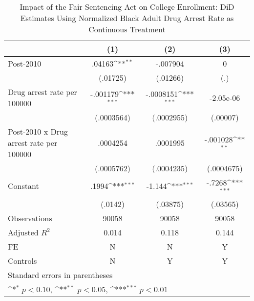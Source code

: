 \begin{table}[htbp]\centering
\def\sym#1{\ifmmode^{#1}\else\(^{#1}\)\fi}
\caption{Impact of the Fair Sentencing Act on College Enrollment: DiD Estimates Using Normalized Black Adult Drug Arrest Rate as Continuous Treatment}
\begin{tabular}{l*{3}{c}}
\hline\hline
                    &\multicolumn{1}{c}{(1)}         &\multicolumn{1}{c}{(2)}         &\multicolumn{1}{c}{(3)}         \\
\hline
Post-2010           &      .04163\sym{**} &    -.007904         &           0         \\
                    &    (.01725)         &    (.01266)         &         (.)         \\
[1em]
Drug arrest rate per 100000&    -.001179\sym{***}&   -.0008151\sym{***}&   -2.05e-06         \\
                    &  (.0003564)         &  (.0002955)         &    (.00007)         \\
[1em]
Post-2010 x Drug arrest rate per 100000&    .0004254         &    .0001995         &    -.001028\sym{**} \\
                    &  (.0005762)         &  (.0004235)         &  (.0004675)         \\
[1em]
Constant            &       .1994\sym{***}&      -1.144\sym{***}&      -.7268\sym{***}\\
                    &     (.0142)         &    (.03875)         &    (.03565)         \\
\hline
Observations        &       90058         &       90058         &       90058         \\
Adjusted \(R^{2}\)  &       0.014         &       0.118         &       0.144         \\
FE                  &           N         &           N         &           Y         \\
Controls            &           N         &           Y         &           Y         \\
\hline\hline
\multicolumn{4}{l}{\footnotesize Standard errors in parentheses}\\
\multicolumn{4}{l}{\footnotesize \sym{*} \(p<0.10\), \sym{**} \(p<0.05\), \sym{***} \(p<0.01\)}\\
\end{tabular}
\end{table}
